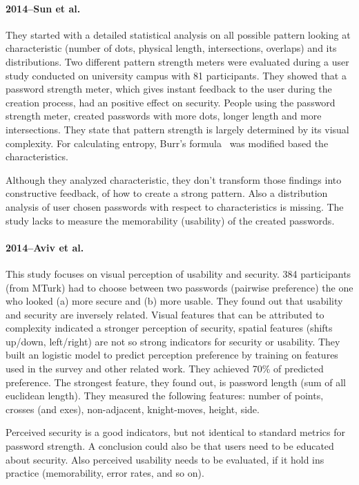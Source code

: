 \documentclass[twocolumn, a4paper, 10pt]{article}
\begin{document}
\paragraph{2014--Sun et al.~\cite{Sun2014308}}
They started with a detailed statistical analysis on all possible pattern looking at characteristic (number of dots, physical length, intersections, overlaps) and its distributions. Two different pattern strength meters were evaluated during a user study conducted on university campus with 81 participants. They showed that a password strength meter, which gives instant feedback to the user during the creation process, had an positive effect on security. People using the password strength meter, created passwords with more dots, longer length and more intersections. They state that pattern strength is largely determined by its visual complexity. For calculating entropy, Burr's formula~\cite{burr2004electronic} was modified based the  characteristics.

Although they analyzed characteristic, they don't transform those findings into constructive feedback, of how to create a strong pattern. Also a distribution analysis of user chosen passwords with respect to characteristics is missing. The study lacks to measure the memorability (usability) of the created passwords.

\paragraph{2014--Aviv et al.~\cite{Aviv:2014:UVP:2664243.2664253}}
This study focuses on visual perception of usability and security. 384 participants (from MTurk) had to choose between two passwords (pairwise preference) the one who looked (a) more secure and (b) more usable. They found out that usability and security are inversely related. Visual features that can be attributed to complexity indicated a stronger perception of security, spatial features (shifts up/down, left/right) are not so strong indicators for security or usability. They built an logistic model to predict perception preference by training on features used in the survey and other related work. They achieved 70\%  of predicted preference. The strongest feature, they found out, is password length (sum of all euclidean length). They measured the following features: number of points, crosses (and exes), non-adjacent, knight-moves, height, side.

Perceived security is a good indicators, but not identical to standard metrics for password strength. A conclusion could also be that users need to be educated about security. Also perceived usability needs to be evaluated, if it hold ins practice (memorability, error rates, and so on).
\end{document}
